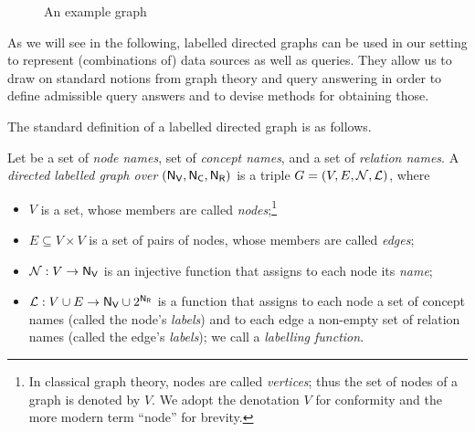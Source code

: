 \begin{figure}
  \caption{An example graph}
  \label{fig:example_graph}
\end{figure}

As we will see in the following, labelled directed graphs can be used in our setting
to represent (combinations of) data sources as well as queries.
They allow us to draw on standard notions from graph theory and query answering
in order to define admissible query answers and to devise methods for obtaining those.

The standard definition of a labelled directed graph is as follows.

%
\begin{definition}
  \label{def:ld_graph}
  Let \NV be a set of \emph{node names}, \NC set of \emph{concept names}, and \NR a set of \emph{relation names}.
  A \emph{directed labelled graph over $(\mathsf{N}_\mathsf{V},\mathsf{N}_\mathsf{C},\mathsf{N}_\mathsf{R})$} is a triple $G = (V,E,\mathcal{N},\mathcal{L})$,
  where
  \begin{itemize}
    \item
      $V$ is a set, whose members are called \emph{nodes};\footnote{%
        In classical graph theory, nodes are called \emph{vertices}; thus the set of
        nodes of a graph is denoted by $V$. We adopt the denotation $V$ for conformity
        and the more modern term ``node'' for brevity.%
      }      
    \item 
      $E \subseteq V \times V$ is a set of pairs of nodes, whose members are called \emph{edges};
    \item
      $\mathcal{N} : V \to \mathsf{N}_\mathsf{V}$ is an injective function that assigns
      to each node its \emph{name};
    \item
      $\mathcal{L} : V \cup E \to \mathsf{N}_\mathsf{V} \cup 2^{\mathsf{N}_\mathsf{R}}$ is a function that assigns 
      to each node a set of concept names (called the node's \emph{labels}) and
      to each edge a non-empty set of relation names (called the edge's \emph{labels});
      we call \Lmc a \emph{labelling function}.
  \end{itemize}
\end{definition}

